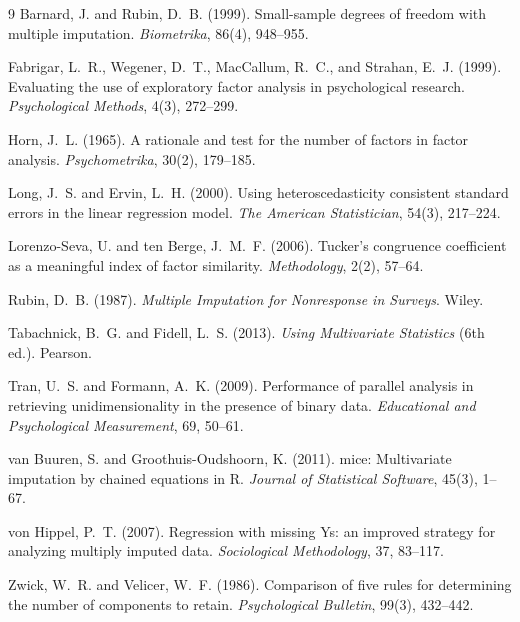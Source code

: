 \documentclass[11pt,a4paper]{article}
\begin{document}
\begin{thebibliography}{9}
Barnard, J. and Rubin, D.~B. (1999).
Small-sample degrees of freedom with multiple imputation.
\emph{Biometrika}, 86(4), 948--955.

Fabrigar, L.~R., Wegener, D.~T., MacCallum, R.~C., and Strahan, E.~J. (1999).
Evaluating the use of exploratory factor analysis in psychological research.
\emph{Psychological Methods}, 4(3), 272--299.

Horn, J.~L. (1965).
A rationale and test for the number of factors in factor analysis.
\emph{Psychometrika}, 30(2), 179--185.

Long, J.~S. and Ervin, L.~H. (2000).
Using heteroscedasticity consistent standard errors in the linear regression model.
\emph{The American Statistician}, 54(3), 217--224.

Lorenzo-Seva, U. and ten Berge, J.~M.~F. (2006).
Tucker's congruence coefficient as a meaningful index of factor similarity.
\emph{Methodology}, 2(2), 57--64.

Rubin, D.~B. (1987).
\emph{Multiple Imputation for Nonresponse in Surveys}.
Wiley.

Tabachnick, B.~G. and Fidell, L.~S. (2013).
\emph{Using Multivariate Statistics} (6th ed.). Pearson.

Tran, U.~S. and Formann, A.~K. (2009).
Performance of parallel analysis in retrieving unidimensionality in the presence of binary data.
\emph{Educational and Psychological Measurement}, 69, 50--61.

van Buuren, S. and Groothuis-Oudshoorn, K. (2011).
mice: Multivariate imputation by chained equations in R.
\emph{Journal of Statistical Software}, 45(3), 1--67.

von Hippel, P.~T. (2007).
Regression with missing Ys: an improved strategy for analyzing multiply imputed data.
\emph{Sociological Methodology}, 37, 83--117.

Zwick, W.~R. and Velicer, W.~F. (1986).
Comparison of five rules for determining the number of components to retain.
\emph{Psychological Bulletin}, 99(3), 432--442.
\end{thebibliography}
\end{document}

